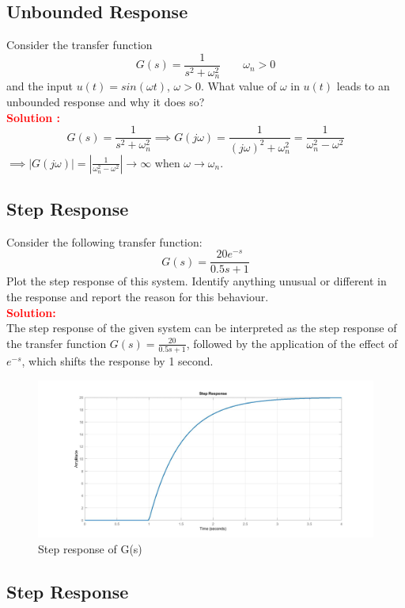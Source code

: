 \documentclass[12pt]{article}
\begin{document}
\clearpage
\subsection{Unbounded Response}
Consider the transfer function
\[
G(s)=\frac{1}{s^2+\omega_n^2} \qquad \omega_n >0
\]
and the input $u(t) = sin(\omega t)$,  $\omega>0$. What value of $\omega$ in $u(t)$ leads to an unbounded response and why it does so? \\

\textbf{\textcolor{red}{Solution :}} \\
\[
G(s)=\frac{1}{s^2+\omega_n^2} \implies G(j \omega) =\frac{1}{(j \omega)^2 +\omega_n^2}  =\frac{1}{\omega_n^2 - \omega^2}
\]
$\implies |G(j \omega)| =\left| \frac{1}{\omega_n^2 - \omega^2}\right| \rightarrow \infty$ when $\omega \rightarrow \omega_n$.

\clearpage
\subsection{Step Response}
Consider the following transfer function:
\[
G(s)=\frac{20 e^{-s}}{0.5s+1}
\]
Plot the step response of this system. Identify anything unusual or different in the response and report the reason for this behaviour. \\ 
\noindent \textbf{\textcolor{red}{Solution:}} \\
The step response of the given system can be interpreted as the step response of the transfer function \(G(s) = \frac{20}{0.5s+1}\), followed by the application of the effect of \(e^{-s}\), which shifts the response by 1 second.

\begin{figure}[h!]
    \centering
    \includegraphics[width=0.75\linewidth]{figs/3.20.jpg}
    \caption{Step response of G(s)}
    \label{fig:prb45}
\end{figure}

\clearpage
\subsection{Step Response}
\end{document}
